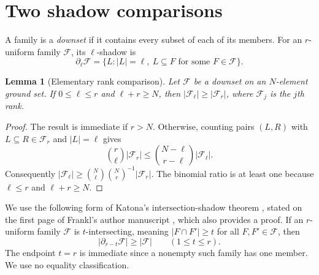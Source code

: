 \documentclass[11pt,a4paper]{article}
\newtheorem{lemma}[theorem]{Lemma}
\theoremstyle{remark}
\newcommand{\F}{\mathcal F}
\begin{document}
\section{Two shadow comparisons}

A family is a \emph{downset} if it contains every subset of each of its members. For an $r$-uniform family $\F$, its $\ell$-shadow is
\[
\partial_\ell\F=\{L:|L|=\ell,\ L\subseteq F\text{ for some }F\in\F\}.
\]

\begin{lemma}[Elementary rank comparison]\label{lem:ordinary}
Let $\F$ be a downset on an $N$-element ground set. If $0\leq\ell\leq r$ and $\ell+r\geq N$, then $|\F_\ell|\geq|\F_r|$, where $\F_j$ is the $j$th rank.
\end{lemma}
\begin{proof}
The result is immediate if $r>N$. Otherwise, counting pairs $(L,R)$ with $L\subseteq R\in\F_r$ and $|L|=\ell$ gives
\[
\binom r\ell|\F_r|\leq\binom{N-\ell}{r-\ell}|\F_\ell|.
\]
Consequently $|\F_\ell|\geq\binom N\ell\binom Nr^{-1}|\F_r|$. The binomial ratio is at least one because $\ell\leq r$ and $\ell+r\geq N$.
\end{proof}

We use the following form of Katona's intersection-shadow theorem \cite{Katona}, stated on the first page of Frankl's author manuscript \cite{Frankl}, which also provides a proof. If an $r$-uniform family $\F$ is $t$-intersecting, meaning $|F\cap F'|\geq t$ for all $F,F'\in\F$, then
\begin{equation}\label{eq:katona}
|\partial_{r-t}\F|\geq|\F| \qquad (1\leq t\leq r).
\end{equation}
The endpoint $t=r$ is immediate since a nonempty such family has one member. We use no equality classification.
\end{document}
